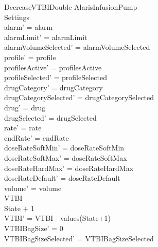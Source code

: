 \begin{schema}{DecreaseVTBIDouble}
	\Delta AlarisInfusionPump\\
	Settings\\
	\where
	alarm' = alarm\\
	alarmLimit' = alarmLimit\\
	alarmVolumeSelected' = alarmVolumeSelected\\
	profile' = profile\\
	profilesActive' = profilesActive\\  
	  profileSelected' = profileSelected\\
	drugCategory' = drugCategory\\ drugCategorySelected' = drugCategorySelected\\
	drug' = drug\\ drugSelected' = drugSelected\\
	rate' = rate\\
	endRate' = endRate\\
	doseRateSoftMin' = doseRateSoftMin\\
	doseRateSoftMax' = doseRateSoftMax\\
	doseRateHardMax' = doseRateHardMax\\
	doseRateDefault' = doseRateDefault\\
	volume' = volume\\
	VTBI \\
	State + 1 \\
	VTBI' = VTBI - values(State+1)\\
	VTBIBagSize' = 0\\ VTBIBagSizeSelected' = VTBIBagSizeSelected\\

\end{schema}
